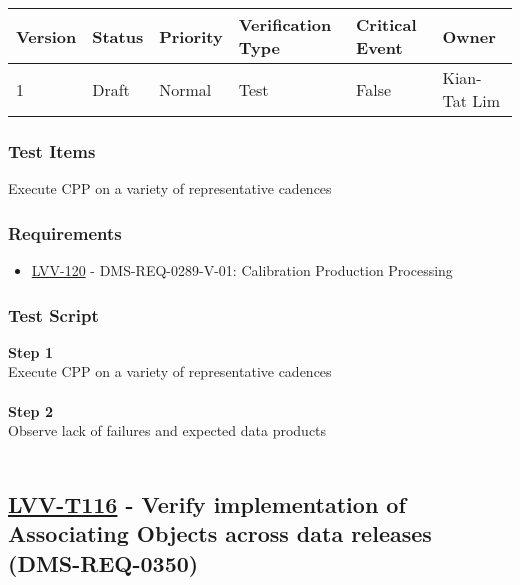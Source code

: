 \begin{longtable}[]{@{}llllll@{}}
\toprule
Version & Status & Priority & Verification Type & Critical Event &
Owner\tabularnewline
\midrule
\endhead
1 & Draft & Normal & Test & False & Kian-Tat Lim\tabularnewline
\bottomrule
\end{longtable}

\hypertarget{test-items-91}{%
\subsubsection{Test Items}\label{test-items-91}}

Execute CPP on a variety of representative cadences

\hypertarget{requirements-92}{%
\subsubsection{Requirements}\label{requirements-92}}

\begin{itemize}
\tightlist
\item
  \href{https://jira.lsstcorp.org/browse/LVV-120}{LVV-120} -
  DMS-REQ-0289-V-01: Calibration Production Processing
\end{itemize}

\hypertarget{test-script-92}{%
\subsubsection{Test Script}\label{test-script-92}}

\textbf{Step 1}\\
Execute CPP on a variety of representative cadences\\
~\\
\textbf{Step 2}\\
Observe lack of failures and expected data products\\
~\\

\hypertarget{lvv-t116---verify-implementation-of-associating-objects-across-data-releases-dms-req-0350}{%
\subsection{\texorpdfstring{\href{https://jira.lsstcorp.org/secure/Tests.jspa\#/testCase/LVV-T116}{LVV-T116}
- Verify implementation of Associating Objects across data releases
(DMS-REQ-0350)}{LVV-T116 - Verify implementation of Associating Objects across data releases (DMS-REQ-0350)}}\label{lvv-t116---verify-implementation-of-associating-objects-across-data-releases-dms-req-0350}}

